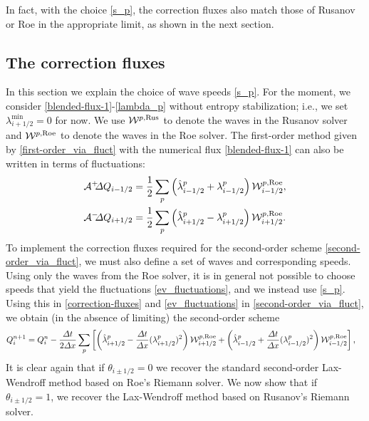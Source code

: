 \documentclass[preprint, 11pt]{article}
\newcommand{\W}{{\mathcal W}}
\newcommand{\A}{{\mathcal A}}
\newcommand{\apdq}{\A^+ \!\!{\Delta} Q}
\newcommand{\amdq}{\A^- \!\!{\Delta} Q}
\newcommand{\imh}{{i-1/2}}
\newcommand{\iph}{{i+1/2}}
\newcommand{\bfq}{{Q}}
\newcommand{\Rus}{{\rm Rus}}
\newcommand{\Roe}{{\rm Roe}}
\begin{document}
In fact, with the choice \eqref{s_p}, the correction fluxes also match
those of Rusanov or Roe in the appropriate limit, as shown in the next section.

\subsection{The correction fluxes}
In this section we explain the choice of wave speeds \eqref{s_p}.
For the moment, we consider \eqref{blended-flux-1}-\eqref{lambda_p} without
entropy stabilization; i.e., we set $\lambda^{\min}_\iph=0$
for now.
We use $\W^{p,\Rus}$ to denote the waves in the Rusanov
solver and $\W^{p,\Roe}$ to denote the waves in the Roe solver.
The first-order method given by \eqref{first-order_via_fluct} with the numerical
flux \eqref{blended-flux-1} can also be written in
terms of fluctuations:
\begin{subequations}\label{ev_fluctuations}
\begin{align}
  \apdq_\imh & = \frac{1}{2}\sum_p \left(\hat\lambda_{i-1/2}^p + \lambda_{i-1/2}^p\right)\W_{i-1/2}^{p,\Roe}, \\
  \amdq_\iph & = \frac{1}{2}\sum_p \left(\hat\lambda_{i+1/2}^p - \lambda_{i+1/2}^p\right)\W_{i+1/2}^{p,\Roe}.
\end{align}
\end{subequations}
To implement the correction fluxes required for the second-order scheme \eqref{second-order_via_fluct},
we must also define a set of waves and corresponding speeds.
Using only the waves from the Roe solver, it is in general not possible
to choose speeds that yield the fluctuations \eqref{ev_fluctuations},
and we instead use \eqref{s_p}.
Using this in \eqref{correction-fluxes} and \eqref{ev_fluctuations} in 
\eqref{second-order_via_fluct}, we obtain (in the absence of limiting)
the second-order scheme
\begin{align}\label{LWL}
  \bfq_i^{n+1}=\bfq_i^n
  &-\frac{\Delta t}{2 \Delta x}
  \sum_p
  \left[\left(\hat\lambda_{i+1/2}^p -\frac{\Delta t}{\Delta x}(\lambda_{i+1/2}^p)^2 \right)\W_{i+1/2}^{p,\Roe}
  +
  \left(\hat\lambda_{i-1/2}^p +\frac{\Delta t}{\Delta x}(\lambda_{i-1/2}^p)^2 \right)\W_{i-1/2}^{p,\Roe}\right],
\end{align}
It is clear again that if $\theta_{i\pm 1/2}=0$ we recover the standard
second-order Lax-Wendroff method based on Roe's Riemann solver.
We now show that if $\theta_{i\pm 1/2}=1$, we recover the Lax-Wendroff method
based on Rusanov's Riemann solver.
\end{document}
